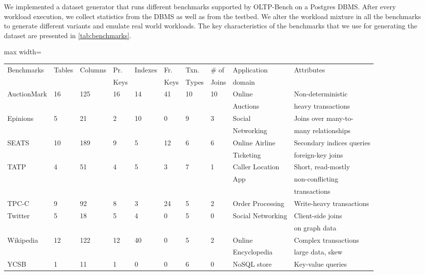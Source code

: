We implemented a dataset generator that runs different benchmarks supported
by OLTP-Bench on a Postgres DBMS. After every workload execution, we
collect statistics from the DBMS as well as from the testbed. We alter the
workload mixture in all the benchmarks to generate different variants and
emulate real world workloads. The key characteristics of the benchmarks
that we use for generating the dataset are presented in \cref{tab:benchmarks}.

\begin{table*}
  \centering
  \begin{adjustbox}{max width=\textwidth}
  \begin{tabular}{l|lllllllll} \toprule
   Benchmarks & Tables & Columns & Pr. & Indexes &	Fr. & 
   Txn. & \# of & Application  & Attributes  \\
   & & & Keys & & Keys & Types & Joins  & domain & \\
   \midrule
	AuctionMark 	& 16 	& 125  &	16 &	14 &	41 &	10 &	10 &	Online &
	Non-deterministic\\
	& & & & & & & & Auctions &  heavy transactions \\
	Epinions 		& 5 	& 21   & 	2  &	10 &	 0 & 	9  &	3  &	Social  & Joins over
	many-to- \\
	& & & & & & & & Networking & many relationships  \\
	SEATS &	10 &	189 &	9 	& 5 	& 12 	& 6 &	6 &	Online Airline  &
	Secondary indices queries\\
	& & & & & & & & Ticketing & foreign-key joins \\
	TATP &	4 	& 51 &	4 &	5 &	3 &	7 &	1 &	Caller Location  &	Short, read-mostly\\
	& & & & & & & & App & non-conflicting\\
	& & & & & & & & &  transactions\\
	TPC-C &	9 &	92 &	8 &	3 &	24 &	5 &	2 &	Order Processing & Write-heavy
	transactions\\
	Twitter &	5 &	18 &	5 &	4 &	0 &	5 &	0 &	Social Networking & Client-side joins \\
	& & & & & & & & & on	graph data \\
	Wikipedia &	12 &	122 &	12 &	40 &	0 &	5 &	2 &	Online &	Complex	transactions \\ 
	& & & & & & & & Encyclopedia & large data, skew  \\
	YCSB &	1 &	11 &	1 &	0 &	0 &	6 &	0 &	NoSQL store &	Key-value queries \\
   \bottomrule
   \end{tabular}
   \end{adjustbox} 
\caption{Key characteristics of the benchmarks used in our evaluation. ``Pr. key''
denotes primary key and ``Fr. key'' denotes foreign key.}
\label{tab:benchmarks}
\end{table*}


